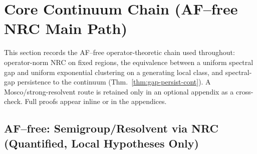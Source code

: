 \documentclass[11pt]{amsart}
\theoremstyle{plain}
\theoremstyle{definition}
\theoremstyle{remark}
\begin{document}
\section{Core Continuum Chain (AF--free NRC Main Path)}
This section records the AF--free operator-theoretic chain used throughout: operator-norm NRC on fixed regions, the equivalence between a uniform spectral gap and uniform exponential clustering on a generating local class, and spectral-gap persistence to the continuum (Thm.~\ref{thm:gap-persist-cont}). A Mosco/strong-resolvent route is retained only in an optional appendix as a cross-check. Full proofs appear inline or in the appendices.
\subsection*{AF--free: Semigroup/Resolvent via NRC (Quantified, Local Hypotheses Only)}
\end{document}

